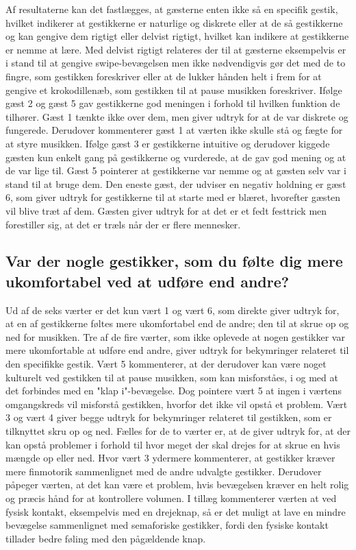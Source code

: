 Af resultaterne kan det fastlægges, at gæsterne enten ikke så en specifik gestik, hvilket indikerer at gestikkerne er naturlige og diskrete eller at de så gestikkerne og kan gengive dem rigtigt eller delvist rigtigt, hvilket kan indikere at gestikkerne er nemme at lære. Med delvist rigtigt relateres der til at gæsterne eksempelvis er i stand til at gengive swipe-bevægelsen men ikke nødvendigvis gør det med de to fingre, som gestikken foreskriver eller at de lukker hånden helt i frem for at gengive et krokodillenæb, som gestikken til at pause musikken foreskriver. Ifølge gæst 2 og gæst 5 gav gestikkerne god meningen i forhold til hvilken funktion de tilhører. Gæst 1 tænkte ikke over dem, men giver udtryk for at de var diskrete og fungerede. Derudover kommenterer gæst 1 at værten ikke skulle stå og fægte for at styre musikken. Ifølge gæst 3 er gestikkerne intuitive og derudover kiggede gæsten kun enkelt gang på gestikkerne og vurderede, at de gav god mening og at de var lige til. Gæst 5 pointerer at gestikkerne var nemme og at gæsten selv var i stand til at bruge dem. Den eneste gæst, der udviser en negativ holdning er gæst 6, som giver udtryk for gestikkerne til at starte med er blæret, hvorefter gæsten vil blive træt af dem. Gæsten giver udtryk for at det er et fedt festtrick men forestiller sig, at det er træls når der er flere mennesker.
%
\subsection{Var der nogle gestikker, som du følte dig mere ukomfortabel ved at udføre end andre?}
\label{TestresultaterSocialAcceptGestikkerUkomfortabelt}
%
Ud af de seks værter er det kun vært 1 og vært 6, som direkte giver udtryk for, at en af gestikkerne føltes mere ukomfortabel end de andre; den til at skrue op og ned for musikken. Tre af de fire værter, som ikke oplevede at nogen gestikker var mere ukomfortable at udføre end andre, giver udtryk for bekymringer relateret til den specifikke gestik. Vært 5 kommenterer, at der derudover kan være noget kulturelt ved gestikken til at pause musikken, som kan misforståes, i og med at det forbindes med en "klap i"-bevægelse. Dog pointere vært 5 at ingen i værtens omgangskreds vil misforstå gestikken, hvorfor det ikke vil opstå et problem. Vært 3 og vært 4 giver begge udtryk for bekymringer relateret til gestikken, som er tilknyttet skru op og ned. Fælles for de to værter er, at de giver udtryk for, at der kan opstå problemer i forhold til hvor meget der skal drejes for at skrue en hvis mængde op eller ned. Hvor vært 3 ydermere kommenterer, at gestikker kræver mere finmotorik sammenlignet med de andre udvalgte gestikker. Derudover påpeger værten, at det kan være et problem, hvis bevægelsen kræver en helt rolig og præcis hånd for at kontrollere volumen. I tillæg kommenterer værten at ved fysisk kontakt, eksempelvis med en drejeknap, så er det muligt at lave en mindre bevægelse sammenlignet med semaforiske gestikker, fordi den fysiske kontakt tillader bedre føling med den pågældende knap. 

